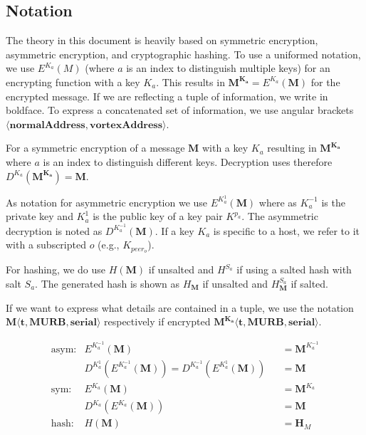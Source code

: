 \documentclass[acmsmall, screen]{acmart}
\begin{document}
\subsection{Notation \label{sec:encNot}}
The theory in this document is heavily based on symmetric encryption, asymmetric encryption, and cryptographic hashing. To use a uniformed notation, we use $E^{K_a}(M)$ (where $a$ is an index to distinguish multiple keys) for an encrypting function with a key $K_a$. This results in $\mathbf{M^{K_a}}=E^{K_a}(\mathbf{M})$ for the encrypted message. If we are reflecting a tuple of information, we write in boldface. To express a concatenated set of information, we use angular brackets $\mathbf{\langle normalAddress,vortexAddress\rangle }$. 

For a symmetric encryption of a message $\mathbf{M}$ with a key $K_a$ resulting in $\mathbf{M^{K_a}}$ where $a$ is an index to distinguish different keys. Decryption uses therefore $D^{K_a}(\mathbf{M^{K_a}})=\mathbf{M}$.

As notation for asymmetric encryption we use $E^{K^{1}_a}(\mathbf{M})$ where as $K^{-1}_a$ is the private key and $K^{1}_a$ is the public key of a key pair $K^{p_a}$. The asymmetric decryption is noted as $D^{K^{-1}_a}(\mathbf{M})$. If a key $K_a$ is specific to a host, we refer to it with a subscripted $o$ (e.g., $K_{peer_o}$).

For hashing, we do use $H(\mathbf{M})$ if unsalted and $H^{S_a}$ if using a salted hash with salt $S_a$. The generated hash is shown as $H_\mathbf{M}$ if unsalted and $H^{S_a}_\mathbf{M}$ if salted.

If we want to express what details are contained in a tuple, we use the notation $\mathbf{M\langle t,MURB,serial\rangle}$ respectively if encrypted $\mathbf{M^{K_{a}}\langle t,MURB,serial\rangle}$.

\begin{align*}
\text{asym:}         & E^{K^{-1}_a}\left(\mathbf{M}\right)                           && =\mathbf{M}^{K^{-1}_a}\\
                     & D^{K^{1}_a}\left(E^{K^{-1}_a}\left(\mathbf{M}\right)\right) = D^{K^{-1}_a}\left(E^{K^{1}_a}\left(\mathbf{M}\right)\right)    	&& =\mathbf{M}\\
\text{sym:}          & E^{K_a}\left(\mathbf{M}\right)                                && =\mathbf{M}^{K_a}\\
					 & D^{K_a}\left(E^{K_a}\left(\mathbf{M}\right)\right)          	 && =\mathbf{M}\\
\text{hash:}		 & H\left(\mathbf{M}\right)                                      && =\mathbf{H}_M
\end{align*}
\end{document}
